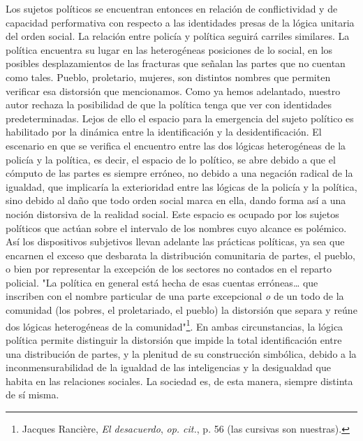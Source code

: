 Los sujetos políticos se encuentran entonces en relación de
conflictividad y de capacidad performativa con respecto a las
identidades presas de la lógica unitaria del orden social. La relación
entre policía y política seguirá carriles similares. La política
encuentra su lugar en las heterogéneas posiciones de lo social, en los
posibles desplazamientos de las fracturas que señalan las partes que no
cuentan como tales. Pueblo, proletario, mujeres, son distintos nombres
que permiten verificar esa distorsión que mencionamos. Como ya hemos
adelantado, nuestro autor rechaza la posibilidad de que la política
tenga que ver con identidades predeterminadas. Lejos de ello el espacio
para la emergencia del sujeto político es habilitado por la dinámica
entre la identificación y la desidentificación. El escenario en que se
verifica el encuentro entre las dos lógicas heterogéneas de la policía y
la política, es decir, el espacio de lo político, se abre debido a que
el cómputo de las partes es siempre erróneo, no debido a una negación
radical de la igualdad, que implicaría la exterioridad entre las lógicas
de la policía y la política, sino debido al daño que todo orden social
marca en ella, dando forma así a una noción distorsiva de la realidad
social. Este espacio es ocupado por los sujetos políticos que actúan
sobre el intervalo de los nombres cuyo alcance es polémico. Así los
dispositivos subjetivos llevan adelante las prácticas políticas, ya sea
que encarnen el exceso que desbarata la distribución comunitaria de
partes, el pueblo, o bien por representar la excepción de los sectores
no contados en el reparto policial. "La política en general está hecha
de esas cuentas erróneas\ldots{} que inscriben con el nombre particular
de una parte excepcional \emph{o} de un todo de la comunidad (los
pobres, el proletariado, el pueblo) la distorsión que separa y reúne dos
lógicas heterogéneas de la comunidad"\footnote{Jacques Rancière,
  \emph{El desacuerdo}, \emph{op. cit.}, p. 56 (las cursivas son
  nuestras).}. En ambas circunstancias, la lógica política permite
distinguir la distorsión que impide la total identificación entre una
distribución de partes, y la plenitud de su construcción simbólica,
debido a la inconmensurabilidad de la igualdad de las inteligencias y la
desigualdad que habita en las relaciones sociales. La sociedad es, de
esta manera, siempre distinta de sí misma.

